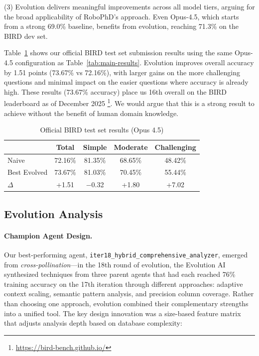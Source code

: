\documentclass{article}
\begin{document}
(3) Evolution delivers meaningful improvements across all model tiers, arguing for the broad applicability of RoboPhD's approach. Even Opus-4.5, which starts from a strong 69.0\% baseline, benefits from evolution, reaching 71.3\% on the BIRD dev set.

Table~\ref{tab:test-results} shows our official BIRD test set submission results using the same Opus-4.5 configuration as Table~\ref{tab:main-results}. Evolution improves overall accuracy by 1.51 points (73.67\% vs 72.16\%), with larger gains on the more challenging questions and minimal impact on the easier questions where accuracy is already high.  These results (73.67\% accuracy) place us 16th overall on the BIRD leaderboard as of December 2025 \footnote{\url{https://bird-bench.github.io/}}.  We would argue that this is a strong result to achieve without the benefit of human domain knowledge.

\begin{table}[h]
\centering
\caption{Official BIRD test set results (Opus 4.5)}
\label{tab:test-results}
\begin{tabular}{lcccc}
\toprule
& \textbf{Total} & \textbf{Simple} & \textbf{Moderate} & \textbf{Challenging} \\
\midrule
Naive & 72.16\% & 81.35\% & 68.65\% & 48.42\% \\
Best Evolved & 73.67\% & 81.03\% & 70.45\% & 55.44\% \\
\midrule
$\Delta$ & +1.51 & $-$0.32 & +1.80 & +7.02 \\
\bottomrule
\end{tabular}
\end{table}

\subsection{Evolution Analysis}
\label{subsec:strategies}

\paragraph{Champion Agent Design.}
Our best-performing agent, \texttt{iter18\_hybrid\_comprehensive\_analyzer}, emerged from \emph{cross-pollination}---in the 18th round of evolution, the Evolution AI synthesized techniques from three parent agents that had each reached 76\% training accuracy on the 17th iteration through different approaches: adaptive context scaling, semantic pattern analysis, and precision column coverage. Rather than choosing one approach, evolution combined their complementary strengths into a unified tool.  The key design innovation was a size-based feature matrix that adjusts analysis depth based on database complexity:
\end{document}
